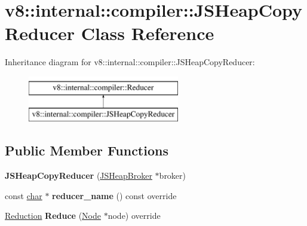 \hypertarget{classv8_1_1internal_1_1compiler_1_1JSHeapCopyReducer}{}\section{v8\+:\+:internal\+:\+:compiler\+:\+:J\+S\+Heap\+Copy\+Reducer Class Reference}
\label{classv8_1_1internal_1_1compiler_1_1JSHeapCopyReducer}
Inheritance diagram for v8\+:\+:internal\+:\+:compiler\+:\+:J\+S\+Heap\+Copy\+Reducer\+:\begin{figure}[H]
\begin{center}
\leavevmode
\includegraphics[height=2.000000cm]{classv8_1_1internal_1_1compiler_1_1JSHeapCopyReducer}
\end{center}
\end{figure}
\subsection*{Public Member Functions}
\begin{DoxyCompactItemize}
\item 
\mbox{\label{classv8_1_1internal_1_1compiler_1_1JSHeapCopyReducer_a35eff0168045cc5c181475507678ae12}} 
{\bfseries J\+S\+Heap\+Copy\+Reducer} (\mbox{\hyperlink{classv8_1_1internal_1_1compiler_1_1JSHeapBroker}{J\+S\+Heap\+Broker}} $\ast$broker)
\item 
\mbox{\label{classv8_1_1internal_1_1compiler_1_1JSHeapCopyReducer_a27531b50a917382ca9afe94b84ce7b6e}} 
const \mbox{\hyperlink{classchar}{char}} $\ast$ {\bfseries reducer\+\_\+name} () const override
\item 
\mbox{\label{classv8_1_1internal_1_1compiler_1_1JSHeapCopyReducer_ad681ddeaed67dcabc515518b5ba2aae5}} 
\mbox{\hyperlink{classv8_1_1internal_1_1compiler_1_1Reduction}{Reduction}} {\bfseries Reduce} (\mbox{\hyperlink{classv8_1_1internal_1_1compiler_1_1Node}{Node}} $\ast$node) override
\end{DoxyCompactItemize}
